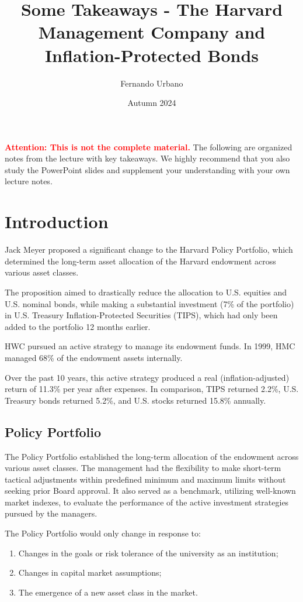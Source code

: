 \documentclass{article}
\title{Some Takeaways - The Harvard Management Company and Inflation-Protected Bonds}
\author{Fernando Urbano}
\date{Autumn 2024}
\newcommand{\redbold}[1]{\textbf{\textcolor{red}{#1}}}
\begin{document}
\maketitle

\redbold{Attention: This is not the complete material.} The following are organized notes from the lecture with key takeaways. We highly recommend that you also study the PowerPoint slides and supplement your understanding with your own lecture notes.

\hypertarget{introduction}{%
\section{Introduction}\label{introduction}}

Jack Meyer proposed a significant change to the Harvard Policy
Portfolio, which determined the long-term asset allocation of the
Harvard endowment across various asset classes.

The proposition aimed to drastically reduce the allocation to U.S.
equities and U.S. nominal bonds, while making a substantial investment
(7\% of the portfolio) in U.S. Treasury Inflation-Protected Securities
(TIPS), which had only been added to the portfolio 12 months earlier.

HWC pursued an active strategy to manage its endowment funds. In 1999,
HMC managed 68\% of the endowment assets internally.

Over the past 10 years, this active strategy produced a real
(inflation-adjusted) return of 11.3\% per year after expenses. In
comparison, TIPS returned 2.2\%, U.S. Treasury bonds returned 5.2\%, and
U.S. stocks returned 15.8\% annually.

\hypertarget{policy-portfolio}{%
\subsection{Policy Portfolio}\label{policy-portfolio}}

The Policy Portfolio established the long-term allocation of the
endowment across various asset classes. The management had the
flexibility to make short-term tactical adjustments within predefined
minimum and maximum limits without seeking prior Board approval. It also
served as a benchmark, utilizing well-known market indexes, to evaluate
the performance of the active investment strategies pursued by the
managers.

The Policy Portfolio would only change in response to:
\begin{enumerate}
    \item Changes in the goals or risk tolerance of the university as an institution;
    \item Changes in capital market assumptions;
    \item The emergence of a new asset class in the market.
\end{enumerate}
\end{document}
